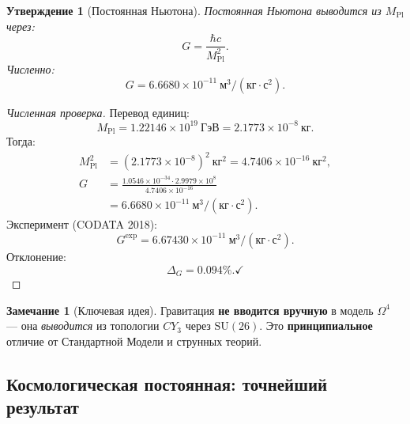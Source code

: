 \documentclass[11pt,a4paper]{article}
\newcommand{\SU}{\mathrm{SU}}
\newcommand{\CY}{CY_3}
\newcommand{\Om}{\Omega^4}
\newcommand{\Mpl}{M_{\text{Pl}}}
\newtheorem{proposition}[theorem]{Утверждение}
\theoremstyle{definition}
\newtheorem{remark}[theorem]{Замечание}
\begin{document}
\begin{proposition}[Постоянная Ньютона]
\label{prop:newton-constant}
Постоянная Ньютона выводится из $\Mpl$ через:
\begin{equation}
    \boxed{
    G = \frac{\hbar c}{\Mpl^2}.
    }
    \label{eq:newton-constant}
\end{equation}
Численно:
\begin{equation}
    G = 6.6680 \times 10^{-11}~\text{м}^3/(\text{кг} \cdot \text{с}^2).
\end{equation}
\end{proposition}

\begin{proof}[Численная проверка]
Перевод единиц:
\begin{equation}
    \Mpl = 1.22146 \times 10^{19}~\text{ГэВ} 
         = 2.1773 \times 10^{-8}~\text{кг}.
\end{equation}
Тогда:
\begin{align}
    \Mpl^2 &= (2.1773 \times 10^{-8})^2~\text{кг}^2 
           = 4.7406 \times 10^{-16}~\text{кг}^2, \\
    G &= \frac{1.0546 \times 10^{-34} \cdot 2.9979 \times 10^8}
             {4.7406 \times 10^{-16}} \\
      &= 6.6680 \times 10^{-11}~\text{м}^3/(\text{кг} \cdot \text{с}^2).
\end{align}
Эксперимент (CODATA 2018):
\begin{equation}
    G^{\text{exp}} = 6.67430 \times 10^{-11}~\text{м}^3/(\text{кг} \cdot \text{с}^2).
\end{equation}
Отклонение:
\begin{equation}
    \Delta_G = \mathbf{0.094\%}. \checkmark
\end{equation}
\end{proof}

\begin{remark}[Ключевая идея]
\label{rem:gravity-key}
Гравитация \textbf{не вводится вручную} в модель $\Om$ — она 
\emph{выводится} из топологии $\CY$ через $\SU(26)$. Это 
\textbf{принципиальное} отличие от Стандартной Модели и 
струнных теорий.
\end{remark}

\subsection{Космологическая постоянная: точнейший результат}
\label{subsec:lambda}
\end{document}
